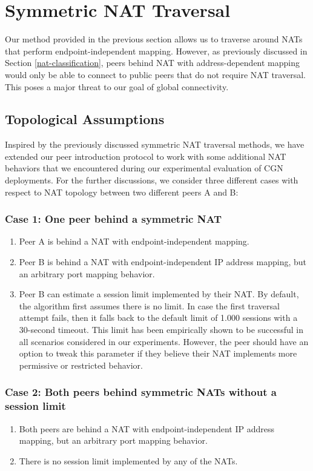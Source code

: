\section{Symmetric NAT Traversal}

Our method provided in the previous section allows us to traverse around NATs that perform endpoint-independent mapping. However, as previously discussed in Section \ref{nat-classification}, peers behind NAT with address-dependent mapping would only be able to connect to public peers that do not require NAT traversal. This poses a major threat to our goal of global connectivity.


\subsection{Topological Assumptions}

Inspired by the previously discussed symmetric NAT traversal methods, we have extended our peer introduction protocol to work with some additional NAT behaviors that we encountered during our experimental evaluation of CGN deployments. For the further discussions, we consider three different cases with respect to NAT topology between two different peers A and B:

\subsubsection{Case 1: One peer behind a symmetric NAT}

\begin{enumerate}
    \item Peer A is behind a NAT with endpoint-independent mapping.
    \item Peer B is behind a NAT with endpoint-independent IP address mapping, but an arbitrary port mapping behavior.
    \item Peer B can estimate a session limit implemented by their NAT. By default, the algorithm first assumes there is no limit. In case the first traversal attempt fails, then it falls back to the default limit of 1.000 sessions with a 30-second timeout. This limit has been empirically shown to be successful in all scenarios considered in our experiments. However, the peer should have an option to tweak this parameter if they believe their NAT implements more permissive or restricted behavior.
\end{enumerate}

\subsubsection{Case 2: Both peers behind symmetric NATs without a session limit}
\begin{enumerate}
    \item Both peers are behind a NAT with endpoint-independent IP address mapping, but an arbitrary port mapping behavior.
    \item There is no session limit implemented by any of the NATs.
\end{enumerate}

